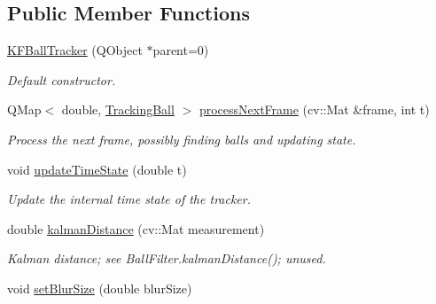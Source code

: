 \subsection*{Public Member Functions}
\begin{DoxyCompactItemize}
\item 
\hyperlink{classKFBallTracker_a40ded1e8adb3b0c059020261a525e2d9}{K\+F\+Ball\+Tracker} (Q\+Object $\ast$parent=0)\hypertarget{classKFBallTracker_a40ded1e8adb3b0c059020261a525e2d9}{}\label{classKFBallTracker_a40ded1e8adb3b0c059020261a525e2d9}

\begin{DoxyCompactList}\small\item\em Default constructor. \end{DoxyCompactList}\item 
Q\+Map$<$ double, \hyperlink{classTrackingBall}{Tracking\+Ball} $>$ \hyperlink{classKFBallTracker_a05f0f8a1a585c78f3745d269627b7020}{process\+Next\+Frame} (cv\+::\+Mat \&frame, int t)\hypertarget{classKFBallTracker_a05f0f8a1a585c78f3745d269627b7020}{}\label{classKFBallTracker_a05f0f8a1a585c78f3745d269627b7020}

\begin{DoxyCompactList}\small\item\em Process the next frame, possibly finding balls and updating state. \end{DoxyCompactList}\item 
void \hyperlink{classKFBallTracker_ad8aa6f450a38ce33092e8afe7896615a}{update\+Time\+State} (double t)\hypertarget{classKFBallTracker_ad8aa6f450a38ce33092e8afe7896615a}{}\label{classKFBallTracker_ad8aa6f450a38ce33092e8afe7896615a}

\begin{DoxyCompactList}\small\item\em Update the internal time state of the tracker. \end{DoxyCompactList}\item 
double \hyperlink{classKFBallTracker_ad94490e1a5931e582a2325686d337d5d}{kalman\+Distance} (cv\+::\+Mat measurement)
\begin{DoxyCompactList}\small\item\em Kalman distance; see Ball\+Filter.\+kalman\+Distance(); unused. \end{DoxyCompactList}\item 
void \hyperlink{classKFBallTracker_af36c51fbe11211d3b843dc2454bdfdc8}{set\+Blur\+Size} (double blur\+Size)\hypertarget{classKFBallTracker_af36c51fbe11211d3b843dc2454bdfdc8}{}\label{classKFBallTracker_af36c51fbe11211d3b843dc2454bdfdc8}


\end{DoxyCompactItemize}
